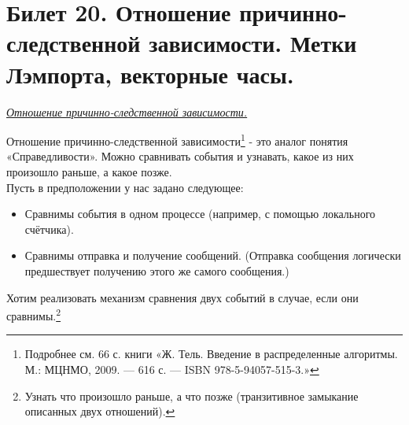 \newpage
\section{Билет 20. Отношение причинно-следственной зависимости. Метки Лэмпорта, векторные часы.}\label{b20}
\begin{center}
    \textit{\underline{Отношение причинно-следственной зависимости.}}
\end{center}
 Отношение причинно-следственной зависимости\footnote{Подробнее см. 66 с. книги «Ж. Тель. Введение в распределенные алгоритмы. М.: МЦНМО, 2009. — 616 с. — ISBN 978-5-94057-515-3.»} - это аналог понятия  «Справедливости». Можно сравнивать события и узнавать, какое из них произошло раньше, а какое позже. \\ 
Пусть в предположении у нас задано следующее:
\begin{itemize}
\item Сравнимы события в одном процессе (например, с помощью локального счётчика).
\item Сравнимы отправка и получение сообщений. (Отправка сообщения логически предшествует получению этого же самого сообщения.)
\end{itemize}
Хотим реализовать механизм сравнения двух событий в случае, если они сравнимы.\footnote{Узнать что произошло раньше, а что позже (транзитивное замыкание описанных двух отношений).}

